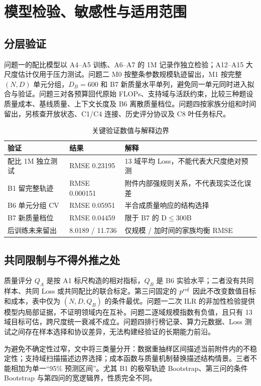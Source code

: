 \section{模型检验、敏感性与适用范围}
\subsection{分层验证}
问题一的配比模型以 A4--A5 训练、A6--A7 的 1M 记录作独立检验；A12--A15 大尺度估计仅用于压力测试。问题二 M0 按整条参数规模轨迹留出，M1 按完整 $(N,D)$ 单元分组，$D_B=600$ 和 B7 新质量水平单列，避免同一单元同时进入拟合与验证。问题三对各预算回代原始 FLOPs、支持域与活跃约束，比较三种题设质量成本、基线质量、上下文长度及 B6 离散质量档位。问题四按家族分组和时间留出，另核查开放状态、C1/C4 连接、历史评分协议及 C8 叶任务标尺。

\begin{table}[htbp]\centering\caption{关键验证数值与解释边界}
\small\begin{tabular}{p{3.2cm}p{2.8cm}p{5.7cm}}\toprule
验证 & 结果 & 解释\\\midrule
配比 1M 独立测试 & RMSE 0.23195 & 13 域平均 Loss，不能代表大尺度绝对预测\\
B1 留完整轨迹 & RMSE 0.000151 & 附件内部强规则关系，不代表现实泛化误差\\
B6 单元分组 CV & RMSE 0.05951 & 半合成质量响应的结构选择\\
B7 新质量档位 & RMSE 0.04459 & 限于 B7 的 D$\leq$300B\\
后训练未来留出 & 8.0189 / 11.736 & 仅规模 / 加时间的家族均衡 RMSE\\\bottomrule
\end{tabular}\end{table}

\subsection{共同限制与不得外推之处}
质量评分 $Q_A$ 是按 A1 标尺构造的相对指标，$Q_B$ 是 B6 实验水平；二者没有共同样本、共同 Loss 或共同配比的联合标定。第三问固定的 $p^{\rm ref}$ 因此不改变数值目标和成本，表中仅为 $(N,D,Q_B)$ 的条件最优。问题一二次 ILR 的非加性检验提供模型内局部证据，不证明领域内在互补。问题二逐域规模指数有负值，且只有 13 域目标可估，跨尺度统一衰减不成立。问题四排行榜记录、算力元数据、Loss 测试之间存在样本选择和协议差异，无法构建经验证的长期能力前沿。

为避免不确定性过窄，文中将三类量分开：数据重抽样区间描述当前附件内的不稳定性；支持域扫描描述边界选择；成本函数与质量机制替换描述结构情景。三者不能相加为单一“95\% 预测区间”。尤其 B1 的极窄轨迹 Bootstrap、第三问的条件 Bootstrap 与第四问的宽逻辑界，性质完全不同。
